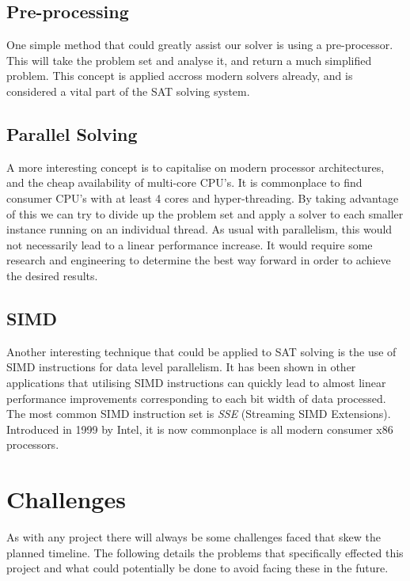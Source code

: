 \documentclass{article}
\begin{document}
\subsection{Pre-processing}
One simple method that could greatly assist our solver is using a pre-processor. This will take the problem set and analyse it, and return a much simplified problem. This concept is applied accross modern solvers already, and is considered a vital part of the SAT solving system.


\subsection{Parallel Solving}
A more interesting concept is to capitalise on modern processor architectures, and the cheap availability of multi-core CPU's. It is commonplace to find consumer CPU's with at least 4 cores and hyper-threading. By taking advantage of this we can try to divide up the problem set and apply a solver to each smaller instance running on an individual thread. As usual with parallelism, this would not necessarily lead to a linear performance increase. It would require some research and engineering to determine the best way forward in order to achieve the desired results.


\subsection{SIMD}
Another interesting technique that could be applied to SAT solving is the use of SIMD instructions for data level parallelism. It has been shown in other applications that utilising SIMD instructions can quickly lead to almost linear performance improvements corresponding to each bit width of data processed. The most common SIMD instruction set is \textit{SSE} (Streaming SIMD Extensions). Introduced in 1999 by Intel, it is now commonplace is all modern consumer x86 processors.


\section{Challenges}
As with any project there will always be some challenges faced that skew the planned timeline. The following details the problems that specifically effected this project and what could potentially be done to avoid facing these in the future.
\end{document}
